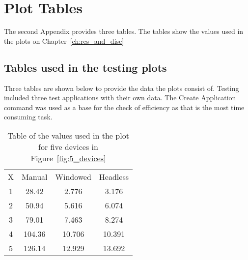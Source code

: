 
\chapter{Plot Tables}\label{appx:tables}

The second Appendix provides three tables.
The tables show the values used in the plots on Chapter~\ref{ch:res_and_disc}

\section{Tables used in the testing plots}
Three tables are shown below to provide the data the plots consist of.
Testing included three test applications with their own data.
The Create Application command was used as a base for the check of efficiency as that is the most time consuming task.

\begin{table}[ht]
    \centering
    \begin{tabular}{c c c c}
    X & Manual & Windowed & Headless  \\
    1 & 28.42 & 2.776 & 3.176  \\
    2 & 50.94 & 5.616 & 6.074  \\
    3 & 79.01 & 7.463 & 8.274 \\
    4 & 104.36 & 10.706 & 10.391  \\
    5 & 126.14 & 12.929 & 13.692  \\
\end{tabular}
    \caption{Table of the values used in the plot for five devices in Figure~\ref{fig:5_devices}}
    \label{tab:5_devices}
\end{table}


